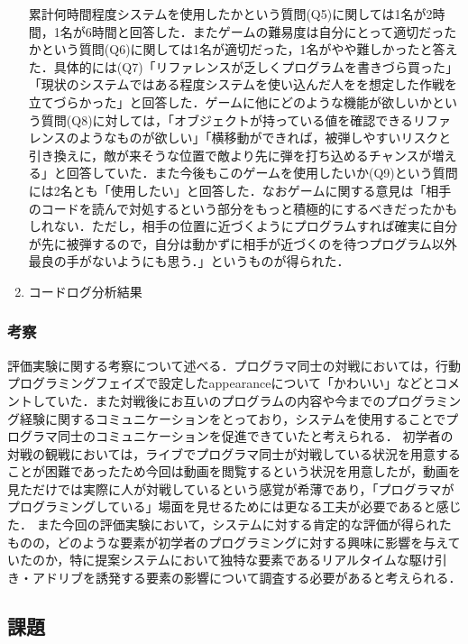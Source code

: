\begin{enumerate}
  累計何時間程度システムを使用したかという質問(Q5)に関しては1名が2時間，1名が6時間と回答した．またゲームの難易度は自分にとって適切だったかという質問(Q6)に関しては1名が適切だった，1名がやや難しかったと答えた．具体的には(Q7)「リファレンスが乏しくプログラムを書きづら買った」「現状のシステムではある程度システムを使い込んだ人をを想定した作戦を立てづらかった」と回答した．ゲームに他にどのような機能が欲しいかという質問(Q8)に対しては，「オブジェクトが持っている値を確認できるリファレンスのようなものが欲しい」「横移動ができれば，被弾しやすいリスクと引き換えに，敵が来そうな位置で敵より先に弾を打ち込めるチャンスが増える」と回答していた．また今後もこのゲームを使用したいか(Q9)という質問には2名とも「使用したい」と回答した．なおゲームに関する意見は「相手のコードを読んで対処するという部分をもっと積極的にするべきだったかもしれない．ただし，相手の位置に近づくようにプログラムすれば確実に自分が先に被弾するので，自分は動かずに相手が近づくのを待つプログラム以外最良の手がないようにも思う．」というものが得られた．

	\item コードログ分析結果
\end{enumerate}

\subsubsection{考察}
評価実験に関する考察について述べる．プログラマ同士の対戦においては，行動プログラミングフェイズで設定したappearanceについて「かわいい」などとコメントしていた．また対戦後にお互いのプログラムの内容や今までのプログラミング経験に関するコミュニケーションをとっており，システムを使用することでプログラマ同士のコミュニケーションを促進できていたと考えられる．
初学者の対戦の観戦においては，ライブでプログラマ同士が対戦している状況を用意することが困難であったため今回は動画を閲覧するという状況を用意したが，動画を見ただけでは実際に人が対戦しているという感覚が希薄であり，「プログラマがプログラミングしている」場面を見せるためには更なる工夫が必要であると感じた．
また今回の評価実験において，システムに対する肯定的な評価が得られたものの，どのような要素が初学者のプログラミングに対する興味に影響を与えていたのか，特に提案システムにおいて独特な要素であるリアルタイムな駆け引き・アドリブを誘発する要素の影響について調査する必要があると考えられる．

\subsection{課題}

